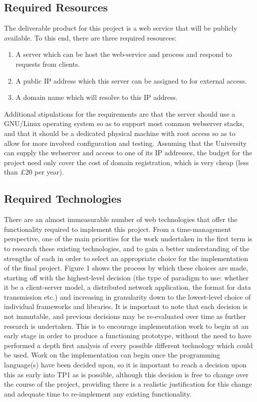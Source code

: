 \documentclass[12pt,a4paper]{article}
\begin{document}
\subsection{Required Resources}
The deliverable product for this project is a web service that will be publicly
available. To this end, there are three required resources:

\begin{enumerate}
\item A server which can be host the web-service and process and respond to
  requests from clients.
\item A public IP address which this server can be assigned to for external
  access.
\item A domain name which will resolve to this IP address.
\end{enumerate}

Additional stipulations for the requirements are that the server should use a
GNU/Linux operating system so as to support most common webserver stacks, and
that it should be a dedicated physical machine with root access so as to allow
for more involved configuration and testing. Assuming that the University can
supply the webserver and access to one of its IP addresses, the budget for the
project need only cover the cost of domain registration, which is very cheap
(less than £20 per year).

\subsection{Required Technologies}
There are an almost immeasurable number of web technologies that offer the
functionality required to implement this project. From a time-management
perspective, one of the main priorities for the work undertaken in the first
term is to research these existing technologies, and to gain a better
understanding of the strengths of each in order to select an appropriate choice
for the implementation of the final project. Figure 1 shows the process by which
these choices are made, starting off with the highest-level decision (the type
of paradigm to use: whether it be a client-server model, a distributed network
application, the format for data transmission etc.) and increasing in
granularity down to the lowest-level choice of individual frameworks and
libraries. It is important to note that each decision is not immutable, and
previous decisions may be re-evaluated over time as further research is
undertaken. This is to encourage implementation work to begin at an early stage
in order to produce a functioning prototype, without the need to have performed
a depth first analysis of every possible different technology which could be
used. Work on the implementation can begin once the programming language(s) have
been decided upon, so it is important to reach a decision upon this as early
into TP1 as is possible, although this decision is free to change over the
course of the project, providing there is a realistic justification for this
change and adequate time to re-implement any existing functionality.
\end{document}
